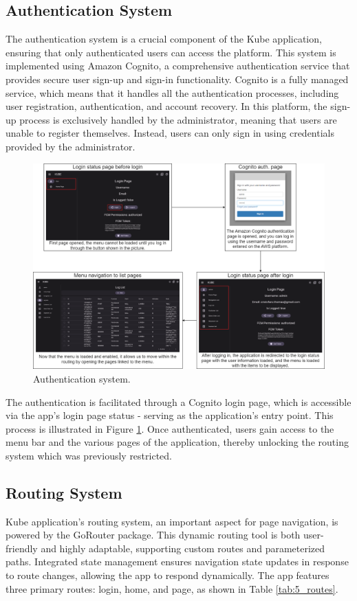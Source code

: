 \subsection{Authentication System}
The authentication system is a crucial component of the Kube application, ensuring that only
authenticated users can access the platform. This system is implemented using Amazon Cognito, a
comprehensive authentication service that provides secure user sign-up and sign-in functionality.
Cognito is a fully managed service, which means that it handles all the authentication processes,
including user registration, authentication, and account recovery.
In this platform, the sign-up process is exclusively handled by the administrator, meaning that
users are unable to register themselves. Instead, users can only sign in using credentials provided
by the administrator.

\begin{figure}
    \centering
    \includegraphics[scale=0.33]{Pictures/5_auth.png}
    \caption{Authentication system.}
    \label{fig:5_auth}
\end{figure}

The authentication is facilitated through a Cognito login page, which is
accessible via the app's login page status - serving as the application's entry point. This process
is illustrated in Figure \ref{fig:5_auth}. Once authenticated, users gain access to the menu bar and
the various pages of the application, thereby unlocking the routing system which was previously
restricted.



\subsection{Routing System}
Kube application's routing system, an important aspect for page navigation, is powered by the
GoRouter package. This dynamic routing tool is both user-friendly and highly adaptable, supporting
custom routes and parameterized paths. Integrated state management ensures navigation state updates
in response to route changes, allowing the app to respond dynamically. The app features three
primary routes: login, home, and page, as shown in Table \ref{tab:5_routes}.

